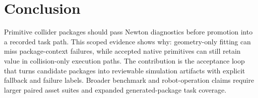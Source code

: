 \section{Conclusion}
\label{sec:conclusion}

Primitive collider packages should pass Newton diagnostics before promotion into a recorded task path.
This scoped evidence shows why: geometry-only fitting can miss package-context failures, while accepted native primitives can still retain value in collision-only execution paths.
The contribution is the acceptance loop that turns candidate packages into reviewable simulation artifacts with explicit fallback and failure labels.
Broader benchmark and robot-operation claims require larger paired asset suites and expanded generated-package task coverage.
